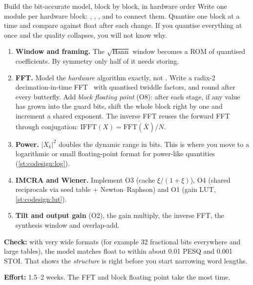 \begin{stepbox}[label=st:codesign:blocks]{Build the bit-accurate model, block by block, in hardware order}
Write one module per hardware block: ,
, , and
 to connect them. Quantise one block at a time and
compare against float after each change. If you quantise everything at once and
the quality collapses, you will not know why.

\begin{enumerate}
  \item \textbf{Window and framing.} The $\sqrt{\text{Hann}}$ window becomes a
  ROM of quantised coefficients. By symmetry only half of it needs storing.
  \item \textbf{FFT.} Model the \emph{hardware} algorithm exactly, not
  . Write a radix-2 decimation-in-time FFT~\cite{cooley1965fft}
  with quantised twiddle factors, and round after every butterfly. Add
  \emph{block floating point} (O8): after each stage, if any value has grown
  into the guard bits, shift the whole block right by one and increment a shared
  exponent. The inverse FFT reuses the forward FFT through conjugation:
  $\mathrm{IFFT}(X)=\overline{\mathrm{FFT}(\overline{X})}/N$.
  \item \textbf{Power.} $|X_k|^2$ doubles the dynamic range in bits. This is
  where you move to a logarithmic or small floating-point format for power-like
  quantities (\cref{st:codesign:log}).
  \item \textbf{IMCRA and Wiener.} Implement O3 (cache $\xi/(1+\xi)$), O4
  (shared reciprocals via seed table + Newton--Raphson) and O1 (gain LUT,
  \cref{st:codesign:lut}).
  \item \textbf{Tilt and output gain} (O2), the gain multiply, the inverse FFT,
  the synthesis window and overlap-add.
\end{enumerate}

\textbf{Check:} with very wide formats (for example 32 fractional bits
everywhere and large tables), the model matches float to within about
0.01 PESQ and 0.001 STOI. That shows the \emph{structure} is
right before you start narrowing word lengths.

\textbf{Effort:} 1.5--2 weeks. The FFT and block floating point take the most
time.
\end{stepbox}

